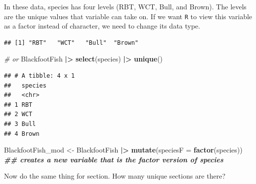 \documentclass[
  10pt,
  letterpaper,
  twoside,
  openright]{book}
\newenvironment{Shaded}{\begin{snugshade}}{\end{snugshade}}
\newcommand{\AttributeTok}[1]{\textcolor[rgb]{0.13,0.29,0.53}{#1}}
\newcommand{\CommentTok}[1]{\textcolor[rgb]{0.56,0.35,0.01}{\textit{#1}}}
\newcommand{\DocumentationTok}[1]{\textcolor[rgb]{0.56,0.35,0.01}{\textbf{\textit{#1}}}}
\newcommand{\FunctionTok}[1]{\textcolor[rgb]{0.13,0.29,0.53}{\textbf{#1}}}
\newcommand{\NormalTok}[1]{#1}
\newcommand{\OtherTok}[1]{\textcolor[rgb]{0.56,0.35,0.01}{#1}}
\newcommand{\SpecialCharTok}[1]{\textcolor[rgb]{0.81,0.36,0.00}{\textbf{#1}}}
\begin{document}
In these data, species has four levels (RBT, WCT, Bull, and Brown). The
levels are the unique values that variable can take on. If we want
\texttt{R} to view this variable as a factor instead of character, we
need to change its data type.

\begin{Shaded}
\end{Shaded}

\begin{verbatim}
## [1] "RBT"   "WCT"   "Bull"  "Brown"
\end{verbatim}

\begin{Shaded}
\begin{Highlighting}[]
\CommentTok{\# or}
\NormalTok{BlackfootFish }\SpecialCharTok{|\textgreater{}}
  \FunctionTok{select}\NormalTok{(species) }\SpecialCharTok{|\textgreater{}}
  \FunctionTok{unique}\NormalTok{()}
\end{Highlighting}
\end{Shaded}

\begin{verbatim}
## # A tibble: 4 x 1
##   species
##   <chr>  
## 1 RBT    
## 2 WCT    
## 3 Bull   
## 4 Brown
\end{verbatim}

\begin{Shaded}
\begin{Highlighting}[]
\NormalTok{BlackfootFish\_mod }\OtherTok{\textless{}{-}}\NormalTok{ BlackfootFish }\SpecialCharTok{|\textgreater{}}
  \FunctionTok{mutate}\NormalTok{(}\AttributeTok{speciesF =} \FunctionTok{factor}\NormalTok{(species))}
\DocumentationTok{\#\# creates a new variable that is the factor version of species}
\end{Highlighting}
\end{Shaded}

Now do the same thing for section. How many unique sections are there?

\begin{Shaded}
\end{Shaded}
\end{document}

